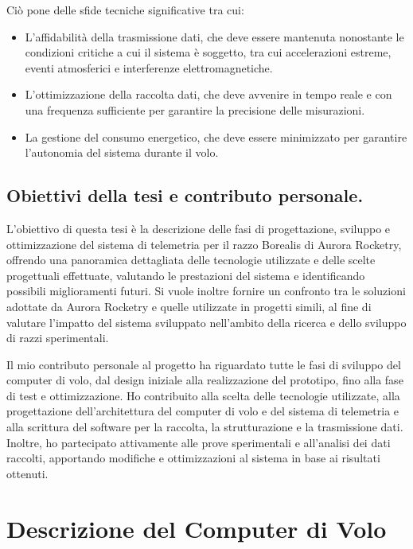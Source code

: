 \documentclass[12pt,a4paper,twoside]{book}
\begin{document}
Ciò pone delle sfide tecniche significative tra cui:
\begin{itemize}
    \item L'affidabilità della trasmissione dati, che deve essere mantenuta 
    nonostante le condizioni critiche a cui il sistema è soggetto, tra cui 
    accelerazioni estreme, eventi atmosferici e interferenze elettromagnetiche.
    \item L'ottimizzazione della raccolta dati, che deve avvenire in tempo reale
     e con una frequenza sufficiente per garantire la precisione delle misurazioni.
    \item La gestione del consumo energetico, che deve essere minimizzato per 
    garantire l'autonomia del sistema durante il volo.
\end{itemize}

\section{Obiettivi della tesi e contributo personale.}
L'obiettivo di questa tesi è la descrizione delle fasi di progettazione, 
sviluppo e ottimizzazione del sistema di telemetria per il razzo Borealis di 
Aurora Rocketry, offrendo una panoramica dettagliata delle tecnologie utilizzate 
e delle scelte progettuali effettuate, valutando le prestazioni del sistema e 
identificando possibili miglioramenti futuri.
Si vuole inoltre fornire un confronto tra le soluzioni adottate da Aurora 
Rocketry e quelle utilizzate in progetti simili, al fine di valutare l'impatto 
del sistema sviluppato nell'ambito della ricerca e dello sviluppo di razzi 
sperimentali.

Il mio contributo personale al progetto ha riguardato tutte le fasi di sviluppo 
del computer di volo, dal design iniziale alla realizzazione del prototipo, fino 
alla fase di test e ottimizzazione.
Ho contribuito alla scelta delle tecnologie utilizzate, alla progettazione 
dell'architettura del computer di volo e del sistema di telemetria e alla 
scrittura del software per la raccolta, la strutturazione e la trasmissione dati.
Inoltre, ho partecipato attivamente alle prove sperimentali e all'analisi dei 
dati raccolti, apportando modifiche e ottimizzazioni al sistema in base ai 
risultati ottenuti.

\chapter{Descrizione del Computer di Volo} \label{chap:flight-computer}
\end{document}
